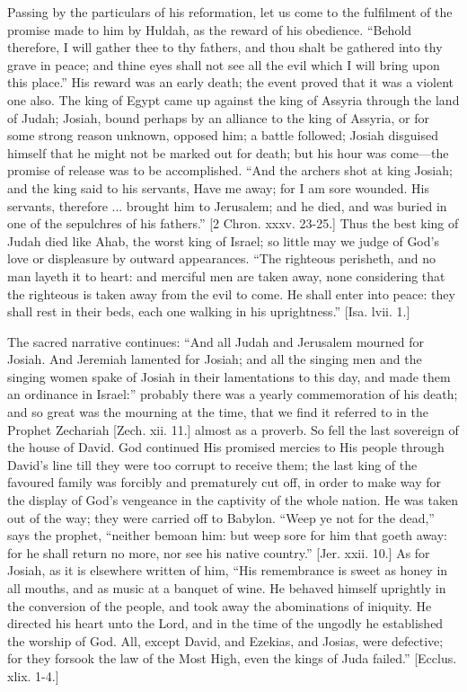 Passing by the particulars of his reformation, let us come to the
fulfilment of the promise made to him by Huldah, as the reward of his
obedience. ``Behold therefore, I will gather thee to thy fathers,
and thou shalt be gathered into thy grave in peace; and thine eyes
shall not see all the evil which I will bring upon this place.''
His reward was an early death; the event proved that it was a violent
one also. The king of Egypt came up against the king of Assyria
through the land of Judah; Josiah, bound perhaps by an alliance to the
king of Assyria, or for some strong reason unknown, opposed him; a
battle followed; Josiah disguised himself that he might not be marked
out for death; but his hour was come—the promise of release was to
be accomplished. ``And the archers shot at king Josiah; and the
king said to his servants, Have me away; for I am sore wounded. His
servants, therefore ... brought him to Jerusalem; and he died, and was
buried in one of the sepulchres of his fathers.'' [2 Chron. xxxv.
23-25.] Thus the best king of Judah died like Ahab, the worst king of
Israel; so little may we judge of God's love or displeasure by outward
appearances. ``The righteous perisheth, and no man layeth it to
heart: and merciful men are taken away, none considering that the
righteous is taken away from the evil to come. He shall enter into
peace: they shall rest in their beds, each one walking in his
uprightness.'' [Isa. lvii. 1.]

The sacred narrative continues: ``And all Judah and Jerusalem
mourned for Josiah. And Jeremiah lamented for Josiah; and all the
singing men and the singing women spake of Josiah in their
lamentations to this day, and made them an ordinance in Israel:''
probably there was a yearly commemoration of his death; and so great
was the mourning at the time, that we find it referred to in the
Prophet Zechariah [Zech. xii. 11.] almost as a proverb. So fell the
last sovereign of the house of David. God continued His promised
mercies to His people through David's line till they were too corrupt
to receive them; the last king of the favoured family was forcibly and
prematurely cut off, in order to make way for the display of God's
vengeance in the captivity of the whole nation. He was taken out of
the way; they were carried off to Babylon. ``Weep ye not for the
dead,'' says the prophet, ``neither bemoan him: but weep sore
for him that goeth away: for he shall return no more, nor see his
native country.'' [Jer. xxii. 10.] As for Josiah, as it is
elsewhere written of him, ``His remembrance is sweet as honey in
all mouths, and as music at a banquet of wine. He behaved himself
uprightly in the conversion of the people, and took away the
abominations of iniquity. He directed his heart unto the Lord, and in
the time of the ungodly he established the worship of God. All, except
David, and Ezekias, and Josias, were defective; for they forsook the
law of the Most High, even the kings of Juda failed.'' [Ecclus.
xlix. 1-4.]

